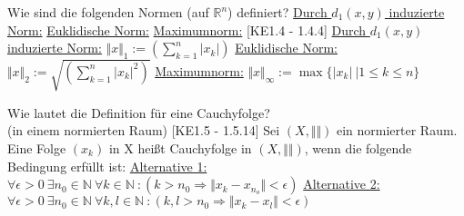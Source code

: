 \documentclass[a6paper
	,10pt
	,grid=none
]{kartei}
\begin{document}
\begin{karte}
	[Normen]
	{
		Wie sind die folgenden Normen (auf $\mathbb{R}^n$) definiert?
		\newline\newline
		\underline{Durch $d_1(x,y)$ induzierte Norm:}		
		\newline\newline\newline\newline\newline\newline
		\underline{Euklidische Norm:}
		\newline\newline\newline\newline\newline\newline
		\underline{Maximumnorm:}
	}
	[KE1.4 - 1.4.4]
	{
		\underline{Durch $d_1(x,y)$ induzierte Norm:}
		\newline
		$\displaystyle \Vert x \Vert_1 := \left( \sum_{k=1}^{n} \vert x_k \vert \right)$
		\newline\newline\newline
		\underline{Euklidische Norm:}
		\newline
		$\displaystyle \Vert x \Vert_2 := \sqrt{\left( \sum_{k=1}^{n} \vert x_k \vert^2 \right)}$
		\newline\newline\newline
		\underline{Maximumnorm:}
		\newline
		$\displaystyle \Vert x \Vert_\infty := \max \{\vert x_k\vert \ \vert 1\leq k \leq n \}$
	}
\end{karte}

\begin{karte}
	[Konvergenz]
	{
		Wie lautet die Definition für eine Cauchyfolge? \\ (in einem normierten Raum)
	}
	[KE1.5 - 1.5.14]
	{
		Sei $(X,\Vert \Vert)$ ein normierter Raum. Eine Folge $(x_k)$ in X heißt Cauchyfolge in $(X,\Vert \Vert)$, wenn die folgende Bedingung erfüllt ist: 
		\newline\newline\newline\newline
		\underline{Alternative 1:}\newline
		$ \forall \epsilon>0 \ \exists n_0 \in \mathbb{N} \ \forall k \in \mathbb{N} \ : (k>n_0 \Rightarrow \Vert x_k - x_{n_o} \Vert < \epsilon )$
		\newline\newline\newline\newline
		\underline{Alternative 2:}\newline
		$ \forall \epsilon>0 \ \exists n_0 \in \mathbb{N} \ \forall k,l \in \mathbb{N} \ : (k,l>n_0 \Rightarrow \Vert x_k - x_l \Vert < \epsilon )$
	}
\end{karte}
\end{document}
